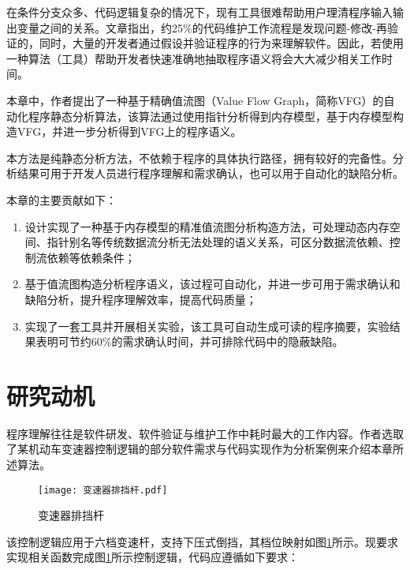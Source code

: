在条件分支众多、代码逻辑复杂的情况下，现有工具很难帮助用户理清程序输入输出变量之间的关系。文章指出，约25\%的代码维护工作流程是发现问题-修改-再验证的，同时，大量的开发者通过假设并验证程序的行为来理解软件\cite{maalej2014comprehension}。因此，若使用一种算法（工具）帮助开发者快速准确地抽取程序语义将会大大减少相关工作时间。

本章中，作者提出了一种基于精确值流图（Value Flow Graph，简称VFG）的自动化程序静态分析算法，该算法通过使用指针分析得到内存模型，基于内存模型构造VFG，并进一步分析得到VFG上的程序语义。

本方法是纯静态分析方法，不依赖于程序的具体执行路径，拥有较好的完备性。分析结果可用于开发人员进行程序理解和需求确认，也可以用于自动化的缺陷分析。

本章的主要贡献如下：
\begin{enumerate}
	\item 设计实现了一种基于内存模型的精准值流图分析构造方法，可处理动态内存空间、指针别名等传统数据流分析无法处理的语义关系，可区分数据流依赖、控制流依赖等依赖条件；
	\item 基于值流图构造分析程序语义，该过程可自动化，并进一步可用于需求确认和缺陷分析，提升程序理解效率，提高代码质量；
	\item 实现了一套工具并开展相关实验，该工具可自动生成可读的程序摘要，实验结果表明可节约60\%的需求确认时间，并可排除代码中的隐蔽缺陷。
\end{enumerate}

\section{研究动机}

程序理解往往是软件研发、软件验证与维护工作中耗时最大的工作内容。作者选取了某机动车变速器控制逻辑的部分软件需求与代码实现作为分析案例来介绍本章所述算法。

\begin{figure}[H]
	\centering
	\texttt{[image: 变速器排挡杆.pdf]}
	\caption{变速器排挡杆}
	\label{fig:gearLever}
\end{figure}

该控制逻辑应用于六档变速杆，支持下压式倒挡，其档位映射如图\ref{fig:gearLever}所示。现要求实现相关函数完成图\ref{fig:gearLever}所示控制逻辑，代码应遵循如下要求：

